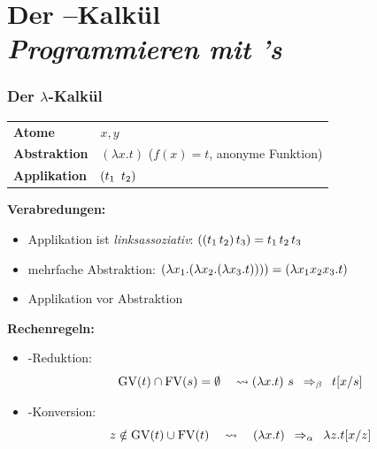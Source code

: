 \documentclass{beamer}
\DeclareMathOperator{\GV}{GV}
\DeclareMathOperator{\FV}{FV}
\begin{document}
\section{Der \textlambda--Kalkül \\ \normalsize \itshape Programmieren mit \textlambda's}

\begin{frame}\frametitle{Der $\lambda$-Kalkül}
	\footnotesize
	\begin{tabular}{@{}ll}
		\textbf{Atome} & $x,y$ \\
		\textbf{Abstraktion} & $(\lambda x.t)$\hspace{1cm} \textcolor{cdgray}{($f(x) = t$, anonyme Funktion)} \\
		\textbf{Applikation} & $(t_1 \enskip  t_2)$
	\end{tabular}

	\medskip
	
	\textbf{Verabredungen:} \vspace{-1em}
	\begin{itemize}
		\item Applikation ist \textit{linksassoziativ}: 
		$((t_1 \, t_2) \, t_3) = t_1 \, t_2 \, t_3 \enskip$ %
		\item mehrfache Abstraktion: 
		$(\lambda x_1 . (\lambda x_2 . (\lambda x_3 . t)))) = (\lambda x_1 x_2 x_3 . t) \enskip$ %
		\item Applikation vor Abstraktion
	\end{itemize}


	\textbf{Rechenregeln:} \vspace{-1em}
	\begin{itemize}
		\item \textbeta-Reduktion: 
		\begin{equation*}
			\GV(t) \cap \FV(s) = \emptyset \quad \leadsto (\lambda x . t) \ s \enskip \Rightarrow_\beta \enskip t[x / s]
		\end{equation*}
		\item \textalpha-Konversion:
		\begin{equation*}
			z \notin \GV(t) \cup \FV(t) \quad \leadsto \quad (\lambda x . t) \enskip \Rightarrow_\alpha \enskip \lambda z . t[x / z]
		\end{equation*}
	\end{itemize}
\end{frame}
\end{document}
